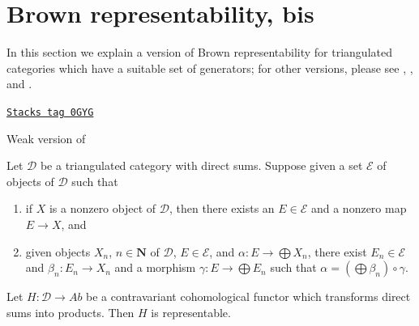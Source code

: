 \section{Brown representability, bis}
\label{derived-section-brown-bis}
In this section we explain a version of Brown representability
for triangulated categories which have a suitable set of generators;
for other versions, please see \cite{Franke}, \cite{Neeman}, and \cite{Krause}.

\begin{lemma}
\label{derived-lemma-brown-bis}
\href{https://stacks.math.columbia.edu/tag/0GYG}{\texttt{Stacks tag 0GYG}}

\begin{reference}
Weak version of \cite[Theorem A]{Krause}
\end{reference}
Let $\mathcal{D}$ be a triangulated category with direct sums.
Suppose given a set $\mathcal{E}$ of objects of $\mathcal{D}$ such that
\begin{enumerate}
\item if $X$ is a nonzero object of $\mathcal{D}$, then there exists
an $E \in \mathcal{E}$ and a nonzero map $E \to X$, and
\item given objects $X_n$, $n \in \mathbf{N}$ of $\mathcal{D}$,
$E \in \mathcal{E}$, and $\alpha : E \to \bigoplus X_n$,
there exist $E_n \in \mathcal{E}$ and $\beta_n : E_n \to X_n$ and a morphism
$\gamma : E \to \bigoplus E_n$ such that
$\alpha = (\bigoplus \beta_n) \circ \gamma$.
\end{enumerate}
Let $H : \mathcal{D} \to \textit{Ab}$ be a contravariant cohomological functor
which transforms direct sums into products. Then $H$ is representable.
\end{lemma}

